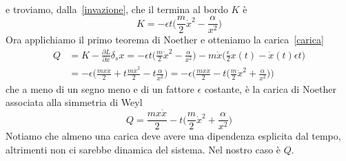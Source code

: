 \begin{example}
\begin{equation}
\begin{aligned}
    \end{aligned}
    \end{equation}
        e troviamo, dalla~\eqref{invazione}, che il termina al bordo $K$ è 
    \begin{equation*}
        K = - \epsilon t \Big (\frac{m}{2} \dot x^2 - \frac{\alpha}{x^2} \Big)
    \end{equation*}
        Ora applichiamo il primo teorema di Noether e otteniamo la carica~\eqref{carica} 
    \begin{equation}
    \begin{aligned}
        Q & = K - \frac{\partial L}{\partial \dot x} \delta_s x = - \epsilon t \Big (\frac{m}{2} \dot x^2 - \frac{\alpha}{x^2} \Big) - m \dot x \Big (\frac{\epsilon}{2} x(t) - \dot x(t) \epsilon t \Big ) \\ & = - \epsilon \Big ( \frac{m x \dot x }{2} + t \frac{m \dot x^2}{2} - t \frac{\alpha}{x^2} \Big) = - \epsilon \Big ( \frac{m x \dot x}{2} - t \Big ( \frac{m}{2} \dot x^2 + \frac{\alpha}{x^2} \Big ) \Big )
    \end{aligned}
    \end{equation}
        che a meno di un segno meno e di un fattore $\epsilon$ costante, è la carica di Noether associata alla simmetria di Weyl
    \begin{equation} \label{carica1}
        Q = \frac{m x \dot x}{2} - t \Big( \frac{m}{2} \dot x^2 + \frac{\alpha}{x^2} \Big)
    \end{equation}
        Notiamo che almeno una carica deve avere una dipendenza esplicita dal tempo, altrimenti non ci sarebbe dinamica del sistema. Nel nostro caso è $Q$.

        \hfill


\end{example}
